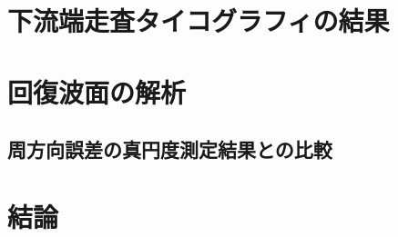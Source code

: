 \section{下流端走査タイコグラフィの結果}

\clearpage
\newpage

\section{回復波面の解析}
\subsection{周方向誤差の真円度測定結果との比較}

\section{結論}
\label{chap5_conclusion}



